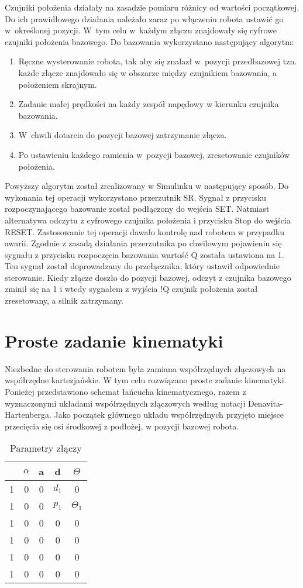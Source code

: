 Czujniki położenia działały na zasadzie pomiaru różnicy od wartości początkowej. Do ich prawidłowego działania należało zaraz po włączeniu robota ustawić go w~określonej pozycji. W~tym celu w~każdym złączu znajdowały się cyfrowe czujniki położenia bazowego. Do bazowania wykorzystano następujący algorytm:
\begin{enumerate}
\item Ręczne wysterowanie robota, tak aby się znalazł w~pozycji przedbazowej tzn. każde złącze znajdowało się w obszarze między czujnikiem bazowania, a położeniem skrajnym.
\item Zadanie małej prędkości na każdy zespół napędowy w kierunku czujnika bazowania.
\item W~chwili dotarcia do pozycji bazowej zatrzymanie złącza.
\item Po ustawieniu każdego ramienia w~pozycji bazowej, zresetowanie czujników położenia.
\end{enumerate}
Powyższy algorytm został zrealizowany w Simulinku w następujący sposób.
Do wykonania tej operacji wykorzystano przerzutnik SR. Sygnał z przycisku rozpoczynającego bazowanie został podłączony do wejścia SET. Natmiast alternatywa odczytu z cyfrowego czujnika położenia i przycisku Stop do wejścia RESET. Zastosowanie tej operacji dawało kontrolę nad robotem w przypadku awarii. Zgodnie z zasadą działania przerzutnika po chwilowym pojawieniu się sygnału z przycisku rozpoczęcia bazowania wartość Q została ustawiona na 1. Ten sygnał został doprowadzany do przełącznika, który ustawił odpowiednie sterowanie. Kiedy złącze doszło do pozycji bazowej, odczyt z czujnika bazowego zminił się na 1 i wtedy sygnałem z wyjścia !Q czujnik położenia został zresetowany, a silnik zatrzymany.

\section{Proste zadanie kinematyki}

Niezbedne do sterowania robotem była zamiana współrzędnych złączowych na współrzędne kartezjańskie. W tym celu rozwiązano proste zadanie kinematyki. 
Ponieżej przedstawiono schemat łańcucha kinematycznego, razem z wyznaczonymi układami współrzędnych złączowych według notacji Denavita-Hartenberga. Jako początek głównego układu współrzędnych przyjęto miejsce przecięcia się osi środkowej z podłożej, w pozycji bazowej robota.
\begin{table}[h]
\begin{center}
\begin{tabular}{r|c c c c}
& $\alpha$ & a & d & $\Theta$ \\ \hline
1 & 0 & 0 & $d_1$ & 0 \\
1 & 0 & 0 & $p_1$ & $\Theta_1$ \\
1 & 0 & 0 & 0 & 0 \\
1 & 0 & 0 & 0 & 0 \\
1 & 0 & 0 & 0 & 0 \\
1 & 0 & 0 & 0 & 0 \\
\end{tabular}
\caption{Parametry złączy}
\end{center}
\end{table}

